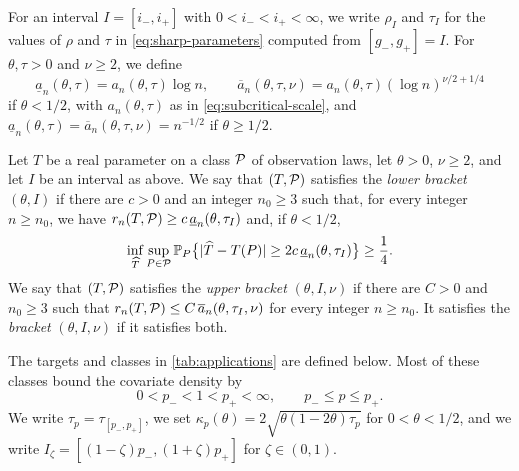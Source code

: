 For an interval $I=[i_-,i_+]$ with $0<i_-<i_+<\infty$, we write
$\rho_I$ and $\tau_I$ for the values of $\rho$ and $\tau$ in
\eqref{eq:sharp-parameters} computed from $[g_-,g_+]=I$. For
$\theta,\tau>0$ and $\nu\ge2$, we define
\begin{equation}\label{eq:app-rates}
 \underline a_n(\theta,\tau)=a_n(\theta,\tau)\log n,\qquad
 \overline a_n(\theta,\tau,\nu)=a_n(\theta,\tau)(\log n)^{\nu/2+1/4}
\end{equation}
if $\theta<1/2$, with $a_n(\theta,\tau)$ as in
\eqref{eq:subcritical-scale}, and
$\underline a_n(\theta,\tau)=\overline a_n(\theta,\tau,\nu)=n^{-1/2}$ if
$\theta\ge1/2$.

\begin{definition}\label{def:bracket}
Let $T$ be a real parameter on a class $\mathcal P$ of observation laws, let
$\theta>0$, $\nu\ge2$, and let $I$ be an interval as above. We say that
$(T,\mathcal P)$ satisfies the \emph{lower bracket} $(\theta,I)$ if there are
$c>0$ and an integer $n_0\ge3$ such that, for every integer $n\ge n_0$,
we have $r_n(T,\mathcal P)\ge c\,\underline a_n(\theta,\tau_I)$ and, if
$\theta<1/2$,
\begin{equation}\label{eq:app-probability}
 \inf_{\widehat T}\sup_{P\in\mathcal P}
 \mathbb P_P\bigl\{|\widehat T-T(P)|\ge2c\,\underline a_n(\theta,\tau_I)\bigr\}
 \ge\frac14 .
\end{equation}
We say that $(T,\mathcal P)$ satisfies the \emph{upper bracket}
$(\theta,I,\nu)$ if there are $C>0$ and $n_0\ge3$ such that
$r_n(T,\mathcal P)\le C\,\overline a_n(\theta,\tau_I,\nu)$ for every integer
$n\ge n_0$. It satisfies the \emph{bracket} $(\theta,I,\nu)$ if it
satisfies both.
\end{definition}

The targets and classes in \cref{tab:applications} are defined below.
Most of these classes bound the covariate density by
\begin{equation}\label{eq:design}
 0<p_-<1<p_+<\infty,\qquad p_-\le p\le p_+ .
\end{equation}
We write $\tau_p=\tau_{[p_-,p_+]}$, we set
$\kappa_p(\theta)=2\sqrt{\theta(1-2\theta)\tau_p}$ for
$0<\theta<1/2$, and we write $I_\zeta=[(1-\zeta)p_-,(1+\zeta)p_+]$ for
$\zeta\in(0,1)$.

